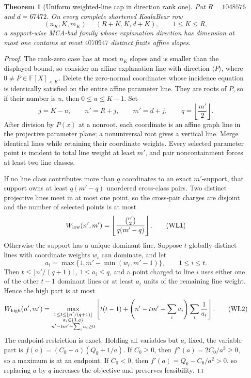 \documentclass[11pt,a4paper]{amsart}
\numberwithin{equation}{section}
\newtheorem{theorem}{Theorem}[section]
\theoremstyle{remark}
\newcommand{\F}{\mathbb F}\newcommand{\B}{\mathbb B}\newcommand{\K}{\mathbb K}\newcommand{\Z}{\mathbb Z}
\begin{document}
\begin{theorem}[Uniform weighted-line cap in direction rank one]
\label{thm:mca-uniform-rank-one-weighted-line}
Put \(R=1048576\) and \(d=67472\).  On every complete shortened
KoalaBear row
\[
 (n_K,K,m_K)=(R+K,K,d+K),
 \qquad 1\le K\le R,
\]
a support-wise MCA-bad family whose explanation direction has dimension at
most one contains at most \(4070947\) distinct finite affine slopes.
\end{theorem}

\begin{proof}
The rank-zero case has at most \(n_K\) slopes and is smaller than the
displayed bound, so consider an affine explanation line with direction
\(\langle P\rangle\), where \(0\ne P\in\F[X]_{<K}\).  Delete the
zero-normal coordinates whose incidence equation is identically satisfied
on the entire affine parameter line.  They are roots of \(P\), so if their
number is \(u\), then \(0\le u\le K-1\).  Set
\[
 j=K-u,\qquad n'=R+j,\qquad m'=d+j,\qquad
 q=\left\lfloor\frac{m'}2\right\rfloor.
\]
After division by \(P(x)\) at a nonroot, each coordinate is an affine graph
line in the projective parameter plane; a nonuniversal root gives a vertical
line.  Merge identical lines while retaining their coordinate weights.
Every selected parameter point is incident to total line weight at least
\(m'\), and pair noncontainment forces at least two line classes.

If no line class contributes more than \(q\) coordinates to an exact
\(m'\)-support, that support owns at least \(q(m'-q)\) unordered cross-class
pairs.  Two distinct projective lines meet in at most one point, so the
cross-pair charges are disjoint and the number of selected points is at most
\[
 W_{\rm low}(n',m')=
 \left\lfloor\frac{\binom{n'}2}{q(m'-q)}\right\rfloor.
 \tag{WL1}\label{eq:mca-rank-one-low}
\]
Otherwise the support has a unique dominant line.  Suppose \(t\) globally
distinct lines with coordinate weights \(w_i\) can dominate, and let
\[
 a_i=\max\{1,m'-\min(w_i,m'-1)\},\qquad 1\le i\le t.
\]
Then \(t\le\lfloor n'/(q+1)\rfloor\), \(1\le a_i\le q\), and a point
charged to line \(i\) uses either one of the other \(t-1\) dominant lines or
at least \(a_i\) units of the remaining line weight.  Hence the high part is
at most
\[
 W_{\rm high}(n',m')=
 \max_{\substack{1\le t\le\lfloor n'/(q+1)\rfloor\\
                  a_i\in\{1,q\}\\
                  n'-tm'+\sum_i a_i\ge0}}
 \left\lfloor t(t-1)+
 \left(n'-tm'+\sum_i a_i\right)\sum_i\frac1{a_i}\right\rfloor.
 \tag{WL2}\label{eq:mca-rank-one-high}
\]
The endpoint restriction is exact.  Holding all variables but \(a_i\)
fixed, the variable part is \(f(a)=(C_0+a)(Q_0+1/a)\).  If \(C_0\ge0\),
then \(f''(a)=2C_0/a^3\ge0\), so a maximum is at an endpoint.  If
\(C_0<0\), then \(f'(a)=Q_0-C_0/a^2>0\), so replacing \(a\) by \(q\)
increases the objective and preserves feasibility.


\end{proof}
\end{document}
